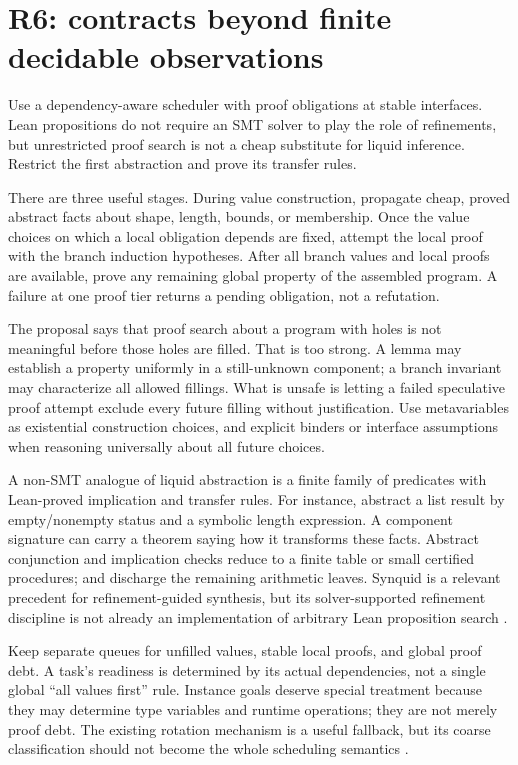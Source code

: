 \section{R6: contracts beyond finite decidable observations}
\label{sec:contracts}

\ans Use a dependency-aware scheduler with proof obligations at stable interfaces. Lean propositions do not require an SMT solver to play the role of refinements, but unrestricted proof search is not a cheap substitute for liquid inference. Restrict the first abstraction and prove its transfer rules.

There are three useful stages. During value construction, propagate cheap, proved abstract facts about shape, length, bounds, or membership. Once the value choices on which a local obligation depends are fixed, attempt the local proof with the branch induction hypotheses. After all branch values and local proofs are available, prove any remaining global property of the assembled program. A failure at one proof tier returns a pending obligation, not a refutation.

The proposal says that proof search about a program with holes is not meaningful before those holes are filled. That is too strong. A lemma may establish a property uniformly in a still-unknown component; a branch invariant may characterize all allowed fillings. What is unsafe is letting a failed speculative proof attempt exclude every future filling without justification. Use metavariables as existential construction choices, and explicit binders or interface assumptions when reasoning universally about all future choices.

A non-SMT analogue of liquid abstraction is a finite family of predicates with Lean-proved implication and transfer rules. For instance, abstract a list result by empty/nonempty status and a symbolic length expression. A component signature can carry a theorem saying how it transforms these facts. Abstract conjunction and implication checks reduce to a finite table or small certified procedures;  and  discharge the remaining arithmetic leaves. Synquid is a relevant precedent for refinement-guided synthesis, but its solver-supported refinement discipline is not already an implementation of arbitrary Lean proposition search \cite{synquid}.

Keep separate queues for unfilled values, stable local proofs, and global proof debt. A task's readiness is determined by its actual dependencies, not a single global ``all values first'' rule. Instance goals deserve special treatment because they may determine type variables and runtime operations; they are not merely proof debt. The existing rotation mechanism is a useful fallback, but its coarse classification should not become the whole scheduling semantics \cite{searchcore}.

